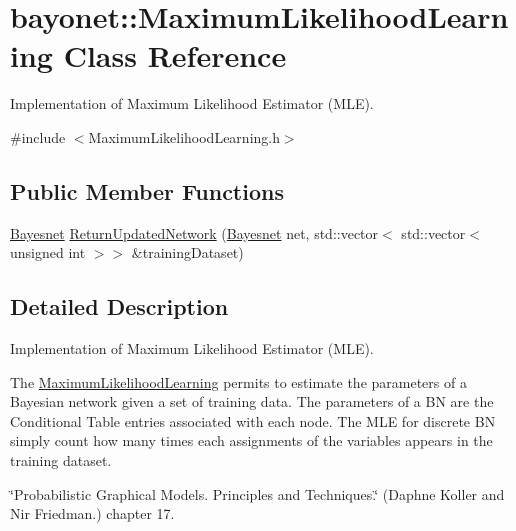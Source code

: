 \hypertarget{classbayonet_1_1_maximum_likelihood_learning}{\section{bayonet\-:\-:Maximum\-Likelihood\-Learning Class Reference}
\label{classbayonet_1_1_maximum_likelihood_learning}
}


Implementation of Maximum Likelihood Estimator (M\-L\-E).  




{\ttfamily \#include $<$Maximum\-Likelihood\-Learning.\-h$>$}

\subsection*{Public Member Functions}
\begin{DoxyCompactItemize}
\item 
\hyperlink{classbayonet_1_1_bayesnet}{Bayesnet} \hyperlink{classbayonet_1_1_maximum_likelihood_learning_a7d621911f54396bc94d9d4a677385a92}{Return\-Updated\-Network} (\hyperlink{classbayonet_1_1_bayesnet}{Bayesnet} net, std\-::vector$<$ std\-::vector$<$ unsigned int $>$$>$ \&training\-Dataset)
\end{DoxyCompactItemize}


\subsection{Detailed Description}
Implementation of Maximum Likelihood Estimator (M\-L\-E). 

The \hyperlink{classbayonet_1_1_maximum_likelihood_learning}{Maximum\-Likelihood\-Learning} permits to estimate the parameters of a Bayesian network given a set of training data. The parameters of a B\-N are the Conditional Table entries associated with each node. The M\-L\-E for discrete B\-N simply count how many times each assignments of the variables appears in the training dataset.

\char`\"{}\-Probabilistic Graphical Models. Principles and Techniques.\char`\"{} (Daphne Koller and Nir Friedman.) chapter 17. 

